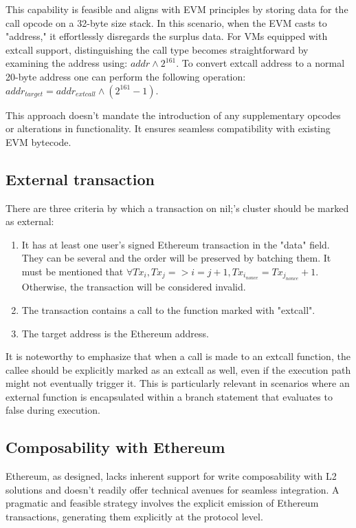 This capability is feasible and aligns with EVM principles by storing data for 
the call opcode on a 32-byte size stack. In this scenario, when the EVM casts to 
"address," it effortlessly disregards the surplus data. For VMs equipped with extcall 
support, distinguishing the call type becomes straightforward by examining the address 
using: \( addr \land 2^{161} \). To convert extcall address to a normal 20-byte address 
one can perform the following operation: 
\( addr_{target} = addr_{extcall} \land (2^{161} - 1) \).

This approach doesn't mandate the introduction of any supplementary opcodes or alterations 
in functionality. It ensures seamless compatibility with existing EVM bytecode. 


\subsection{External transaction}

There are three criteria by which a transaction on nil;'s cluster should be marked as external:
\begin{enumerate}
    \item It has at least one user's signed Ethereum transaction in the "data" field. 
    They can be several and the order will be preserved by batching them.
    It must be mentioned that 
    \( \forall Tx_i, Tx_j => i = j + 1, Tx_{i_{nonce}} = Tx_{j_{nonce}} + 1  \). 
    Otherwise, the transaction will be considered invalid.
    \item The transaction contains a call to the function marked with "extcall".
    \item The target address is the Ethereum address. 
\end{enumerate}

It is noteworthy to emphasize that when a call is made to an extcall function, the callee 
should be explicitly marked as an extcall as well, even if the execution path  might not 
eventually trigger it. This is particularly relevant in scenarios where an external function 
is encapsulated within a branch statement that evaluates to false during execution.


\subsection{Composability with Ethereum}

Ethereum, as designed, lacks inherent support for write composability with L2 solutions and 
doesn't readily offer technical avenues for seamless integration. A pragmatic and feasible 
strategy involves the explicit emission of Ethereum transactions, generating them explicitly 
at the protocol level.

